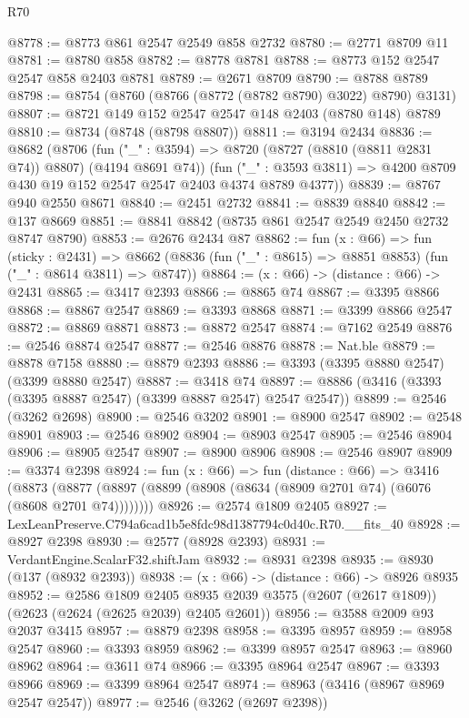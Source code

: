 \begin{lexlean}{R70}
\begin{coremodule}
@8778 := @8773 @861 @2547 @2549 @858 @2732
@8780 := @2771 @8709 @11
@8781 := @8780 @858
@8782 := @8778 @8781
@8788 := @8773 @152 @2547 @2547 @858 @2403 @8781
@8789 := @2671 @8709
@8790 := @8788 @8789
@8798 := @8754 (@8760 (@8766 (@8772 (@8782 @8790) @3022) @8790) @3131)
@8807 := @8721 @149 @152 @2547 @2547 @148 @2403 (@8780 @148) @8789
@8810 := @8734 (@8748 (@8798 @8807))
@8811 := @3194 @2434
@8836 := @8682
    (@8706
      (fun ("_" : @3594) => @8720 (@8727 (@8810 (@8811 @2831 @74)) @8807) (@4194 @8691 @74))
      (fun ("_" : @3593 @3811) => @4200 @8709 @430 @19 @152 @2547 @2547 @2403 @4374 @8789 @4377))
@8839 := @8767 @940 @2550 @8671
@8840 := @2451 @2732
@8841 := @8839 @8840
@8842 := @137 @8669
@8851 := @8841 @8842 (@8735 @861 @2547 @2549 @2450 @2732 @8747 @8790)
@8853 := @2676 @2434 @87
@8862 := fun (x : @66) =>
  fun (sticky : @2431) =>
  @8662 (@8836 (fun ("_" : @8615) => @8851 @8853) (fun ("_" : @8614 @3811) => @8747))
@8864 := (x : @66) -> (distance : @66) -> @2431
@8865 := @3417 @2393
@8866 := @8865 @74
@8867 := @3395 @8866
@8868 := @8867 @2547
@8869 := @3393 @8868
@8871 := @3399 @8866 @2547
@8872 := @8869 @8871
@8873 := @8872 @2547
@8874 := @7162 @2549
@8876 := @2546 @8874 @2547
@8877 := @2546 @8876
@8878 := Nat.ble
@8879 := @8878 @7158
@8880 := @8879 @2393
@8886 := @3393 (@3395 @8880 @2547) (@3399 @8880 @2547)
@8887 := @3418 @74
@8897 := @8886 (@3416 (@3393 (@3395 @8887 @2547) (@3399 @8887 @2547) @2547 @2547))
@8899 := @2546 (@3262 @2698)
@8900 := @2546 @3202
@8901 := @8900 @2547
@8902 := @2548 @8901
@8903 := @2546 @8902
@8904 := @8903 @2547
@8905 := @2546 @8904
@8906 := @8905 @2547
@8907 := @8900 @8906
@8908 := @2546 @8907
@8909 := @3374 @2398
@8924 := fun (x : @66) =>
  fun (distance : @66) =>
  @3416 (@8873 (@8877 (@8897 (@8899 (@8908 (@8634 (@8909 @2701 @74) (@6076 (@8608 @2701 @74))))))))
@8926 := @2574 @1809 @2405
@8927 := LexLeanPreserve.C794a6cad1b5e8fdc98d1387794c0d40c.R70.__fits_40
@8928 := @8927 @2398
@8930 := @2577 (@8928 @2393)
@8931 := VerdantEngine.ScalarF32.shiftJam
@8932 := @8931 @2398
@8935 := @8930 (@137 (@8932 @2393))
@8938 := (x : @66) -> (distance : @66) -> @8926 @8935
@8952 := @2586
    @1809
    @2405
    @8935
    @2039
    @3575
    (@2607 (@2617 @1809))
    (@2623 (@2624 (@2625 @2039) @2405 @2601))
@8956 := @3588 @2009 @93 @2037 @3415
@8957 := @8879 @2398
@8958 := @3395 @8957
@8959 := @8958 @2547
@8960 := @3393 @8959
@8962 := @3399 @8957 @2547
@8963 := @8960 @8962
@8964 := @3611 @74
@8966 := @3395 @8964 @2547
@8967 := @3393 @8966
@8969 := @3399 @8964 @2547
@8974 := @8963 (@3416 (@8967 @8969 @2547 @2547))
@8977 := @2546 (@3262 (@2697 @2398))

\end{coremodule}
\end{lexlean}
